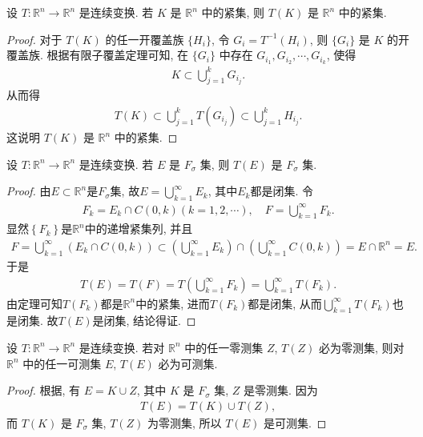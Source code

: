 \documentclass[../../main.tex]{subfiles}
\begin{document}
\begin{theorem}
设 $T:\mathbb{R}^n\to\mathbb{R}^n$ 是连续变换. 若 $K$ 是 $\mathbb{R}^n$ 中的紧集, 则 $T(K)$ 是 $\mathbb{R}^n$ 中的紧集.
\end{theorem}
\begin{proof}
对于 $T(K)$ 的任一开覆盖族 $\{H_i\}$, 令 $G_i = T^{-1}(H_i)$, 则 $\{G_i\}$ 是 $K$ 的开覆盖族. 根据有限子覆盖定理可知, 在 $\{G_i\}$ 中存在 $G_{i_1},G_{i_2},\cdots,G_{i_k}$, 使得
\begin{align*}
K\subset\bigcup_{j = 1}^{k}G_{i_j}.
\end{align*}
从而得
\begin{align*}
T(K)\subset\bigcup_{j = 1}^{k}T(G_{i_j})\subset\bigcup_{j = 1}^{k}H_{i_j}.
\end{align*}
这说明 $T(K)$ 是 $\mathbb{R}^n$ 中的紧集.
\end{proof}

\begin{corollary}
设 $T:\mathbb{R}^n\to\mathbb{R}^n$ 是连续变换. 若 $E$ 是 $F_\sigma$ 集, 则 $T(E)$ 是 $F_\sigma$ 集.
\end{corollary}
\begin{proof}
由$E\subset \mathbb{R} ^n$是$F_{\sigma}$集, 故$E=\bigcup_{k=1}^{\infty}{E_k}$, 其中$E_k$都是闭集. 令
\begin{align*}
F_k=E_k\cap C\left( 0,k \right) \left( k=1,2,\cdots \right) ,\quad F=\bigcup_{k=1}^{\infty}{F_k}.
\end{align*}
显然$\left\{ F_k \right\}$是$\mathbb{R} ^n$中的递增紧集列, 并且
\begin{align*}
F=\bigcup_{k=1}^{\infty}{\left( E_k\cap C\left( 0,k \right) \right)}\subset \left( \bigcup_{k=1}^{\infty}{E_k} \right) \cap \left( \bigcup_{k=1}^{\infty}{C\left( 0,k \right)} \right) =E\cap \mathbb{R} ^n=E.
\end{align*}
于是
\begin{align*}
T\left( E \right) =T\left( F \right) =T\left( \bigcup_{k=1}^{\infty}{F_k} \right) =\bigcup_{k=1}^{\infty}{T\left( F_k \right)}.
\end{align*}
由定理可知$T\left( F_k \right)$都是$\mathbb{R} ^n$中的紧集, 进而$T\left( F_k \right)$都是闭集, 从而$\bigcup_{k=1}^{\infty}{T\left( F_k \right)}$也是闭集. 故$T\left( E \right)$是闭集, 结论得证.
\end{proof}

\begin{corollary}
设 $T:\mathbb{R}^n\to\mathbb{R}^n$ 是连续变换. 若对 $\mathbb{R}^n$ 中的任一零测集 $Z$, $T(Z)$ 必为零测集, 则对 $\mathbb{R}^n$ 中的任一可测集 $E$, $T(E)$ 必为可测集.
\end{corollary}
\begin{proof}
根据, 有 $E = K\cup Z$, 其中 $K$ 是 $F_\sigma$ 集, $Z$ 是零测集. 因为
\begin{align*}
T(E) = T(K)\cup T(Z),
\end{align*}
而 $T(K)$ 是 $F_\sigma$ 集, $T(Z)$ 为零测集, 所以 $T(E)$ 是可测集.
\end{proof}
\end{document}
